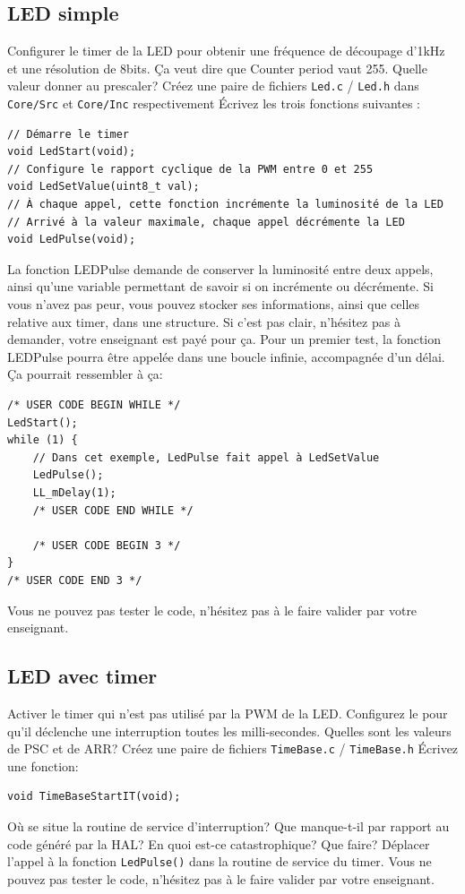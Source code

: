 \documentclass[12pt,%
addpoints,%
]{exam}
\begin{document}
\subsection{LED simple}
\begin{questions}
	\question Configurer le timer de la LED pour obtenir une fréquence de découpage d'1kHz et une résolution de 8bits. 
	Ça veut dire que Counter period vaut 255.
	\question Quelle valeur donner au prescaler?
	\question Créez une paire de fichiers \texttt{Led.c} / \texttt{Led.h} dans \texttt{Core/Src} et \texttt{Core/Inc} respectivement
	\question Écrivez les trois fonctions suivantes :
	\begin{verbatim}
// Démarre le timer
void LedStart(void);
// Configure le rapport cyclique de la PWM entre 0 et 255
void LedSetValue(uint8_t val);
// À chaque appel, cette fonction incrémente la luminosité de la LED
// Arrivé à la valeur maximale, chaque appel décrémente la LED
void LedPulse(void);
	\end{verbatim}
	\question La fonction LEDPulse demande de conserver la luminosité entre deux appels, ainsi qu'une variable permettant de savoir si on incrémente ou décrémente.
	\question Si vous n'avez pas peur, vous pouvez stocker ses informations, ainsi que celles relative aux timer, dans une structure.
	Si c'est pas clair, n'hésitez pas à demander, votre enseignant est payé pour ça.
	\question Pour un premier test, la fonction LEDPulse pourra être appelée dans une boucle infinie, accompagnée d'un délai.
	Ça pourrait ressembler à ça:
	\begin{verbatim}
/* USER CODE BEGIN WHILE */
LedStart();
while (1) {
    // Dans cet exemple, LedPulse fait appel à LedSetValue
    LedPulse();
    LL_mDelay(1);
    /* USER CODE END WHILE */
    
    /* USER CODE BEGIN 3 */
}
/* USER CODE END 3 */
	\end{verbatim}
	\question Vous ne pouvez pas tester le code, n'hésitez pas à le faire valider par votre enseignant.
\end{questions}

\newpage
\subsection{LED avec timer}
\begin{questions}
	\question Activer le timer qui n'est pas utilisé par la PWM de la LED.
	\question Configurez le pour qu'il déclenche une interruption toutes les milli-secondes.
	\question Quelles sont les valeurs de PSC et de ARR?
	\question Créez une paire de fichiers \texttt{TimeBase.c} / \texttt{TimeBase.h}
	\question Écrivez une fonction:
	\begin{verbatim}
void TimeBaseStartIT(void);
	\end{verbatim}
	\question Où se situe la routine de service d'interruption?
	\question Que manque-t-il par rapport au code généré par la HAL? 
	\question En quoi est-ce catastrophique? 
	\question Que faire?
	\question Déplacer l'appel à la fonction \texttt{LedPulse()} dans la routine de service du timer. 
	\question Vous ne pouvez pas tester le code, n'hésitez pas à le faire valider par votre enseignant.
\end{questions}
\end{document}
